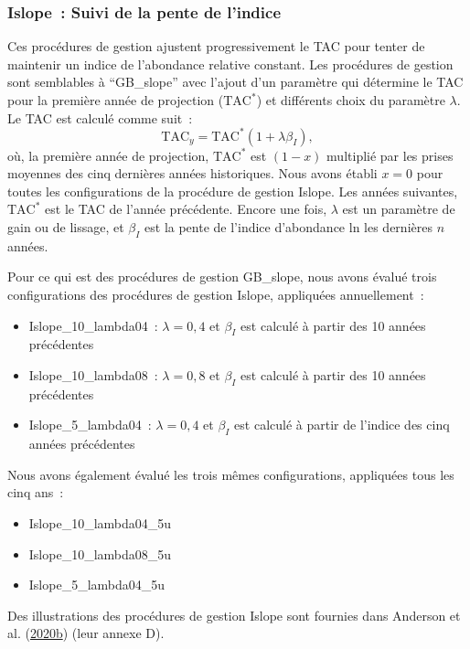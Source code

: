 \documentclass[french,11pt]{book}
\begin{document}
\hypertarget{sec:mp-islope-track}{%
\subsubsection{Islope~: Suivi de la pente de l'indice}\label{sec:mp-islope-track}}

Ces procédures de gestion ajustent progressivement le TAC pour tenter de maintenir un indice de l'abondance relative constant. Les procédures de gestion sont semblables à ``GB\_slope'' avec l'ajout d'un paramètre qui détermine le TAC pour la première année de projection (\(\textrm{TAC}^*\)) et différents choix du paramètre \(\lambda\). Le TAC est calculé comme suit~:
\begin{equation}
\textrm{TAC}_y = \textrm{TAC}^*(1+\lambda \beta_I),
\end{equation}
où, la première année de projection, \(\textrm{TAC}^*\) est \((1-x)\) multiplié par les prises moyennes des cinq dernières années historiques. Nous avons établi \(x = 0\) pour toutes les configurations de la procédure de gestion Islope. Les années suivantes, \(\textrm{TAC}^*\) est le TAC de l'année précédente. Encore une fois, \(\lambda\) est un paramètre de gain ou de lissage, et \(\beta_I\) est la pente de l'indice d'abondance ln les dernières \(n\) années.

Pour ce qui est des procédures de gestion GB\_slope, nous avons évalué trois configurations des procédures de gestion Islope, appliquées annuellement~:
\begin{itemize}
\item
  Islope\_10\_lambda04~: \(\lambda = 0,4\) et \(\beta_I\) est calculé à partir des 10 années précédentes
\item
  Islope\_10\_lambda08~: \(\lambda = 0,8\) et \(\beta_I\) est calculé à partir des 10 années précédentes
\item
  Islope\_5\_lambda04~: \(\lambda = 0,4\) et \(\beta_I\) est calculé à partir de l'indice des cinq années précédentes
\end{itemize}
Nous avons également évalué les trois mêmes configurations, appliquées tous les cinq ans~:
\begin{itemize}
\item
  Islope\_10\_lambda04\_5u
\item
  Islope\_10\_lambda08\_5u
\item
  Islope\_5\_lambda04\_5u
\end{itemize}
Des illustrations des procédures de gestion Islope sont fournies dans Anderson et al. (\protect\hyperlink{ref-anderson2020gfmp}{2020b}) (leur annexe D).
\end{document}
